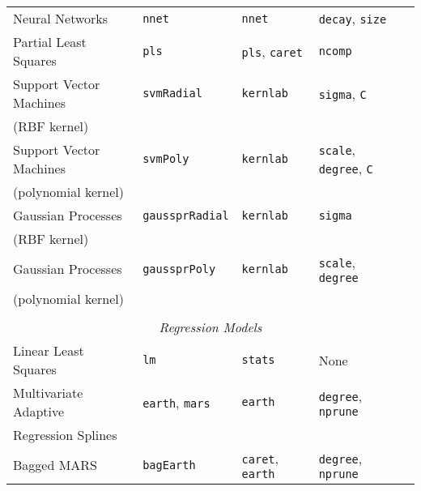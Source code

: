 \documentclass[12pt]{article}
\begin{document}
\begin{longtable}{lllll}
      Neural Networks &               
         \texttt{nnet} & 
            \texttt{nnet}       &       
            \texttt{decay}, \texttt{size} \\      
      
      Partial Least Squares &
         \texttt{pls} & 
            \texttt{pls}, \texttt{caret}       & 
            \texttt{ncomp} \\      
      
      Support Vector Machines  &
         \texttt{svmRadial} & 
            \texttt{kernlab}       & 
            \texttt{sigma}, \texttt{C} \\            
      \:\: (RBF kernel) & & &\\   
      
      Support Vector Machines  &
         \texttt{svmPoly} & 
            \texttt{kernlab}       & 
            \texttt{scale}, \texttt{degree}, \texttt{C} \\            
      \:\: (polynomial kernel) & & &\\  
     Gaussian Processes  &
         \texttt{gaussprRadial} & 
            \texttt{kernlab}       & 
            \texttt{sigma} \\            
      \:\: (RBF kernel) & & &\\   
      
      Gaussian Processes  &
         \texttt{gaussprPoly} & 
            \texttt{kernlab}       & 
            \texttt{scale}, \texttt{degree} \\            
      \:\: (polynomial kernel) & & &\\  
    
      \\
\multicolumn{5}{c}{{{ \em Regression Models}}} \\      
    
      Linear Least Squares &
         \texttt{lm} & 
            \texttt{stats}       & 
            None \\         
      
      Multivariate Adaptive  &
         \texttt{earth}, \texttt{mars} & 
            \texttt{earth}       & 
            \texttt{degree}, \texttt{nprune} \\            
      \:\: Regression Splines & & &\\
            
      Bagged MARS &
         \texttt{bagEarth} & 
            \texttt{caret},  \texttt{earth}      & 
            \texttt{degree}, \texttt{nprune} \\    
            

\end{longtable}
\end{document}
